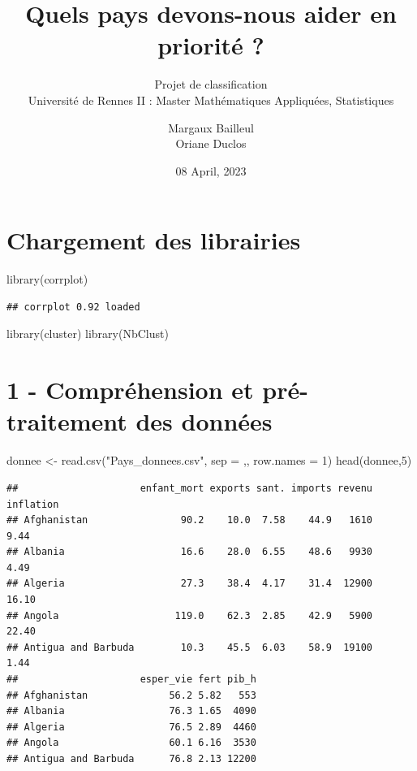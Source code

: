 \documentclass[
]{article}
\title{Quels pays devons-nous aider en priorité ?}
\subtitle{Projet de classification\\
Université de Rennes II : Master Mathématiques Appliquées, Statistiques}
\author{Margaux Bailleul\\
Oriane Duclos}
\date{08 April, 2023}
\newenvironment{Shaded}{}{}
\newcommand{\AttributeTok}[1]{#1}
\newcommand{\DecValTok}[1]{#1}
\newcommand{\FunctionTok}[1]{#1}
\newcommand{\NormalTok}[1]{#1}
\newcommand{\OtherTok}[1]{\textcolor[rgb]{1.00,0.25,0.00}{#1}}
\newcommand{\StringTok}[1]{\textcolor[rgb]{0.00,0.50,0.50}{#1}}
\begin{document}
\maketitle

{
\setcounter{tocdepth}{2}
\tableofcontents
}
\hypertarget{chargement-des-librairies}{%
\section{Chargement des librairies}\label{chargement-des-librairies}}

\begin{Shaded}
\begin{Highlighting}[]
\FunctionTok{library}\NormalTok{(corrplot)}
\end{Highlighting}
\end{Shaded}

\begin{verbatim}
## corrplot 0.92 loaded
\end{verbatim}

\begin{Shaded}
\begin{Highlighting}[]
\FunctionTok{library}\NormalTok{(cluster)}
\FunctionTok{library}\NormalTok{(NbClust)}
\end{Highlighting}
\end{Shaded}

\hypertarget{compruxe9hension-et-pruxe9-traitement-des-donnuxe9es}{%
\section{1 - Compréhension et pré-traitement des
données}\label{compruxe9hension-et-pruxe9-traitement-des-donnuxe9es}}

\begin{Shaded}
\begin{Highlighting}[]
\NormalTok{donnee }\OtherTok{\textless{}{-}} \FunctionTok{read.csv}\NormalTok{(}\StringTok{"Pays\_donnees.csv"}\NormalTok{, }\AttributeTok{sep =} \StringTok{\textquotesingle{},\textquotesingle{}}\NormalTok{, }\AttributeTok{row.names =} \DecValTok{1}\NormalTok{)}
\FunctionTok{head}\NormalTok{(donnee,}\DecValTok{5}\NormalTok{)}
\end{Highlighting}
\end{Shaded}

\begin{verbatim}
##                     enfant_mort exports sant. imports revenu inflation
## Afghanistan                90.2    10.0  7.58    44.9   1610      9.44
## Albania                    16.6    28.0  6.55    48.6   9930      4.49
## Algeria                    27.3    38.4  4.17    31.4  12900     16.10
## Angola                    119.0    62.3  2.85    42.9   5900     22.40
## Antigua and Barbuda        10.3    45.5  6.03    58.9  19100      1.44
##                     esper_vie fert pib_h
## Afghanistan              56.2 5.82   553
## Albania                  76.3 1.65  4090
## Algeria                  76.5 2.89  4460
## Angola                   60.1 6.16  3530
## Antigua and Barbuda      76.8 2.13 12200
\end{verbatim}
\end{document}
